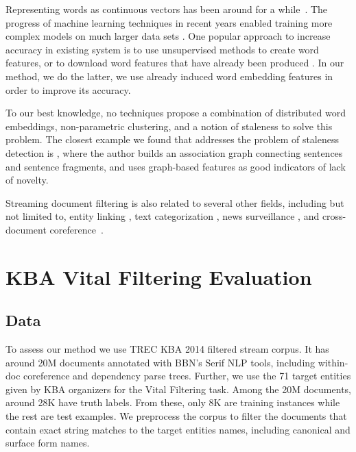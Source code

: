 \documentclass{sig-alternate}
\begin{document}
Representing words as continuous vectors has been around for a while~\cite{Hinton87, Elman90findingstructure}. 
The progress of machine learning techniques in recent years enabled training more complex models on much larger data sets \cite{mikolovChen}. 
One popular approach to increase accuracy in existing system is to use unsupervised methods to create word features, or to download word features that have already been produced \cite{Turian10wordrepresentations}. In our method, we do the latter, we use already induced word embedding features in order to improve its accuracy.

To our best knowledge, no techniques propose a combination of distributed word embeddings, non-parametric clustering, and a notion of staleness to solve this problem. 
The closest example we found that addresses the problem of staleness detection is \citet{gamon}, where the author builds an association graph connecting sentences and sentence fragments, and uses graph-based features as good indicators of lack of novelty.

Streaming document filtering is also related to several other fields, including but not limited to, entity linking \cite{KBP11}, text categorization \cite{HLTCOE12}, news surveillance \cite{Steinberger14}, and cross-document coreference~\cite{RaoMD10,singh11:acl}.

\section{KBA Vital Filtering Evaluation}
\label{evaluation}

\subsection{Data}
\label{data}

To assess our method we use TREC KBA 2014 filtered stream corpus. It has around 20M documents annotated with BBN's Serif NLP tools, including within-doc coreference and dependency parse trees. Further, we use the 71 target entities given by KBA organizers for the Vital Filtering task. Among the 20M documents, around 28K have truth labels. From these, only 8K are training instances while the rest are test examples.
We preprocess the corpus to filter the documents that contain exact string matches to the target entities names, including canonical and surface form names.
\end{document}
